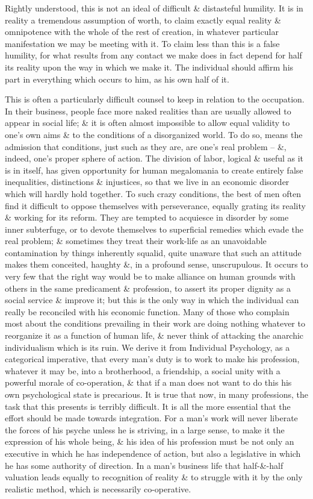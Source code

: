 \documentclass{article}
\begin{document}
Rightly understood, this is not an ideal of difficult \& distasteful humility. It is in reality a tremendous assumption of worth, to claim exactly equal reality \& omnipotence with the whole of the rest of creation, in whatever particular manifestation we may be meeting with it. To claim less than this is a false humility, for what results from any contact we make does in fact depend for half its reality upon the way in which we make it. The individual should affirm his part in everything which occurs to him, as his own half of it.

This is often a particularly difficult counsel to keep in relation to the occupation. In their business, people face more naked realities than are usually allowed to appear in social life; \& it is often almost impossible to allow equal validity to one's own aims \& to the conditions of a disorganized world. To do so, means the admission that conditions, just such as they are, are one's real problem -- \&, indeed, one's proper sphere of action. The division of labor, logical \& useful as it is in itself, has given opportunity for human megalomania to create entirely false inequalities, distinctions \& injustices, so that we live in an economic disorder which will hardly hold together. To such crazy conditions, the best of men often find it difficult to oppose themselves with perseverance, equally grating its reality \& working for its reform. They are tempted to acquiesce in disorder by some inner subterfuge, or to devote themselves to superficial remedies which evade the real problem; \& sometimes they treat their work-life as an unavoidable contamination by things inherently squalid, quite unaware that such an attitude makes them conceited, haughty \&, in a profound sense, unscrupulous. It occurs to very few that the right way would be to make alliance on human grounds with others in the same predicament \& profession, to assert its proper dignity as a social service \& improve it; but this is the only way in which the individual can really be reconciled with his economic function. Many of those who complain most about the conditions prevailing in their work are doing nothing whatever to reorganize it as a function of human life, \& never think of attacking the anarchic individualism which is its ruin. We derive it from Individual Psychology, as a categorical imperative, that every man's duty is to work to make his profession, whatever it may be, into a brotherhood, a friendship, a social unity with a powerful morale of co-operation, \& that if a man does not want to do this his own psychological state is precarious. It is true that now, in many professions, the task that this presents is terribly difficult. It is all the more essential that the effort should be made towards integration. For a man's work will never liberate the forces of his psyche unless he is striving, in a large sense, to make it the expression of his whole being, \& his idea of his profession must be not only an executive in which he has independence of action, but also a legislative in which he has some authority of direction. In a man's business life that half-\&-half valuation leads equally to recognition of reality \& to struggle with it by the only realistic method, which is necessarily co-operative.
\end{document}
